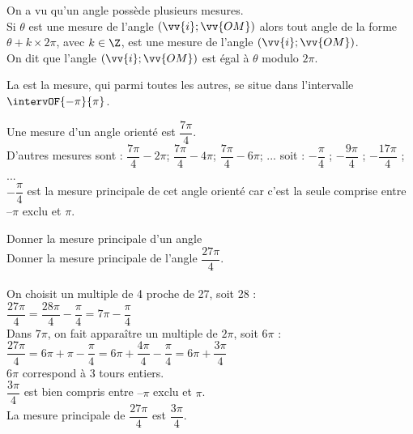         On a vu qu'un angle possède plusieurs mesures.\\
        Si $\theta$ est une mesure de l'angle  $(\vv{i}  ;\vv{OM} )$ alors tout angle de la forme $\theta+k\times2\pi$, avec $k\in \Z$, est une mesure de l'angle $(\vv{i}  ;\vv{OM} )$.\\
        On dit que l'angle $(\vv{i}  ;\vv{OM} )$ est égal à $\theta$ modulo $2\pi$.
        
        \begin{bdefi}
            La  est la mesure, qui parmi toutes les autres, se situe dans l'intervalle $\intervOF{-\pi}{\pi}$.
        \end{bdefi}
        
        \begin{bexemple}
            Une mesure d'un angle orienté est $\dfrac{7\pi}{4}$.\\
            D'autres mesures sont : $\dfrac{7\pi}{4}-2\pi$; $\dfrac{7\pi}{4}-4\pi$; $\dfrac{7\pi}{4}-6\pi$; ... soit : $-\dfrac{\pi}{4}$ ; $-\dfrac{9\pi}{4}$ ; $-\dfrac{17\pi}{4}$ ; ...\\
            $-\dfrac{\pi}{4}$ est la mesure principale de cet angle orienté car c'est la seule comprise entre $–\pi$ exclu et $\pi$.
        \end{bexemple}
        
        \begin{bmethodet}{Donner la mesure principale d'un angle}
            \\
            Donner la mesure principale de l'angle $\dfrac{27\pi}{4}$.\\ 
            \\
                On choisit un multiple de 4 proche de 27, soit 28 :\\
                $\dfrac{27\pi}{4}=\dfrac{28\pi}{4}-\dfrac{\pi}{4}=7\pi-\dfrac{\pi}{4}$\\
                Dans  $7\pi$, on fait apparaître un multiple de $2\pi$, soit $6\pi$ :\\
                $\dfrac{27\pi}{4}=6\pi+\pi-\dfrac{\pi}{4}=6\pi+\dfrac{4\pi}{4}-\dfrac{\pi}{4}=6\pi+\dfrac{3\pi}{4}$\\
                $6\pi$ correspond à 3 tours entiers.\\
                $\dfrac{3\pi}{4}$ est bien compris entre $–\pi$ exclu et $\pi$.\\
                La mesure principale de $\dfrac{27\pi}{4}$ est $\dfrac{3\pi}{4}$. 
        \end{bmethodet}
\vspace{-1cm}

